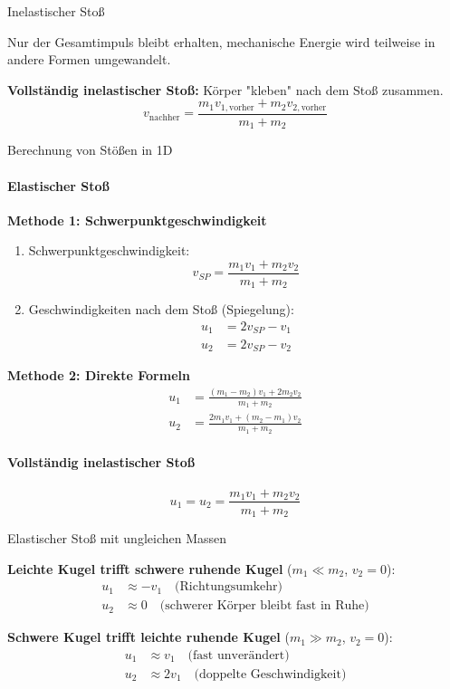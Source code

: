\begin{definition}{Inelastischer Stoß}

    Nur der Gesamtimpuls bleibt erhalten, mechanische Energie wird teilweise in andere Formen umgewandelt.
    
    \textbf{Vollständig inelastischer Stoß:} Körper "kleben" nach dem Stoß zusammen.
    $$
        v_{\text{nachher}} = \frac{m_1 v_{1,\text{vorher}} + m_2 v_{2,\text{vorher}}}{m_1 + m_2}
    $$
\end{definition}


\begin{KR}{Berechnung von Stößen in 1D}
    \paragraph{Elastischer Stoß}
    \textbf{Methode 1: Schwerpunktgeschwindigkeit}
    \begin{enumerate}
        \item Schwerpunktgeschwindigkeit:
        $$
            v_{SP} = \frac{m_1 v_1 + m_2 v_2}{m_1 + m_2}
        $$
        
        \item Geschwindigkeiten nach dem Stoß (Spiegelung):
        \begin{align*}
            u_1 &= 2v_{SP} - v_1 \\
            u_2 &= 2v_{SP} - v_2
        \end{align*}
    \end{enumerate}
    
    \textbf{Methode 2: Direkte Formeln}
    \begin{align*}
        u_1 &= \frac{(m_1 - m_2)v_1 + 2m_2 v_2}{m_1 + m_2} \\
        u_2 &= \frac{2m_1 v_1 + (m_2 - m_1)v_2}{m_1 + m_2}
    \end{align*}
    
    \paragraph{Vollständig inelastischer Stoß}
    $$
        u_1 = u_2 = \frac{m_1 v_1 + m_2 v_2}{m_1 + m_2}
    $$
\end{KR}

\begin{example}{Elastischer Stoß mit ungleichen Massen}

    \textbf{Leichte Kugel trifft schwere ruhende Kugel} ($m_1 \ll m_2$, $v_2 = 0$):
    \begin{align*}
        u_1 &\approx -v_1 \quad \text{(Richtungsumkehr)} \\
        u_2 &\approx 0 \quad \text{(schwerer Körper bleibt fast in Ruhe)}
    \end{align*}
    
    \textbf{Schwere Kugel trifft leichte ruhende Kugel} ($m_1 \gg m_2$, $v_2 = 0$):
    \begin{align*}
        u_1 &\approx v_1 \quad \text{(fast unverändert)} \\
        u_2 &\approx 2v_1 \quad \text{(doppelte Geschwindigkeit)}
    \end{align*}
\end{example}

